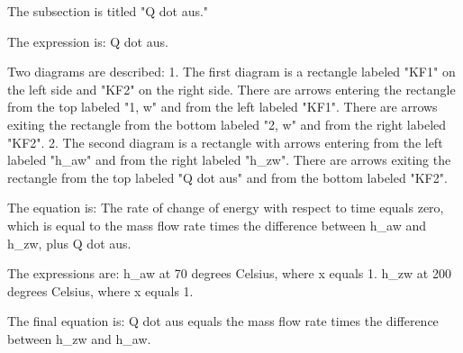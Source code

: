 The subsection is titled "Q dot aus."

The expression is:
Q dot aus.

Two diagrams are described:
1. The first diagram is a rectangle labeled "KF1" on the left side and "KF2" on the right side. There are arrows entering the rectangle from the top labeled "1, w" and from the left labeled "KF1". There are arrows exiting the rectangle from the bottom labeled "2, w" and from the right labeled "KF2".
2. The second diagram is a rectangle with arrows entering from the left labeled "h_aw" and from the right labeled "h_zw". There are arrows exiting the rectangle from the top labeled "Q dot aus" and from the bottom labeled "KF2".

The equation is:
The rate of change of energy with respect to time equals zero, which is equal to the mass flow rate times the difference between h_aw and h_zw, plus Q dot aus.

The expressions are:
h_aw at 70 degrees Celsius, where x equals 1.
h_zw at 200 degrees Celsius, where x equals 1.

The final equation is:
Q dot aus equals the mass flow rate times the difference between h_zw and h_aw.